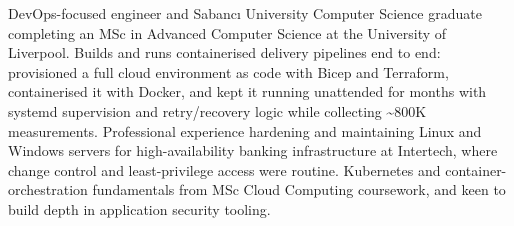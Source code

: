 



DevOps-focused engineer and Sabancı University Computer Science graduate completing an MSc in Advanced Computer Science at the University of Liverpool. Builds and runs containerised delivery pipelines end to end: provisioned a full cloud environment as code with Bicep and Terraform, containerised it with Docker, and kept it running unattended for months with systemd supervision and retry/recovery logic while collecting \textasciitilde 800K measurements. Professional experience hardening and maintaining Linux and Windows servers for high-availability banking infrastructure at Intertech, where change control and least-privilege access were routine. Kubernetes and container-orchestration fundamentals from MSc Cloud Computing coursework, and keen to build depth in application security tooling.




